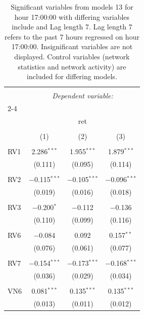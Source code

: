 
\begin{table}[!htbp] \centering 
  \caption{Significant variables from models 13 for hour 17:00:00 with differing variables include 
                               and Lag length 7. Lag length 7 refers to the past 7 hours regressed on hour 17:00:00. 
                               Insignificant variables are not displayed. 
                               Control variables (network statistics and network activity) are 
                               included for differing models.} 
  \label{RVmodels2_t_hourlagged4} 
\scriptsize 
\begin{tabular}{@{\extracolsep{5pt}}lccc} 
\\[-1.8ex]\hline 
\hline \\[-1.8ex] 
 & \multicolumn{3}{c}{\textit{Dependent variable:}} \\ 
\cline{2-4} 
\\[-1.8ex] & \multicolumn{3}{c}{ret} \\ 
\\[-1.8ex] & (1) & (2) & (3)\\ 
\hline \\[-1.8ex] 
 RV1 & 2.286$^{***}$ & 1.955$^{***}$ & 1.879$^{***}$ \\ 
  & (0.111) & (0.095) & (0.114) \\ 
  & & & \\ 
 RV2 & $-$0.115$^{***}$ & $-$0.105$^{***}$ & $-$0.096$^{***}$ \\ 
  & (0.019) & (0.016) & (0.018) \\ 
  & & & \\ 
 RV3 & $-$0.200$^{*}$ & $-$0.112 & $-$0.136 \\ 
  & (0.110) & (0.099) & (0.116) \\ 
  & & & \\ 
 RV6 & $-$0.084 & 0.092 & 0.157$^{**}$ \\ 
  & (0.076) & (0.061) & (0.077) \\ 
  & & & \\ 
 RV7 & $-$0.154$^{***}$ & $-$0.173$^{***}$ & $-$0.168$^{***}$ \\ 
  & (0.036) & (0.029) & (0.034) \\ 
  & & & \\ 
 VN6 & 0.081$^{***}$ & 0.135$^{***}$ & 0.135$^{***}$ \\ 
  & (0.013) & (0.011) & (0.012) \\ 

\end{tabular}
\end{table}
